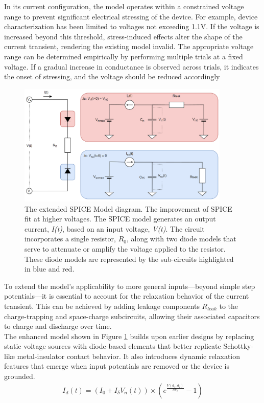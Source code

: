 \noindent In its current configuration, the model operates within a constrained voltage range to prevent significant electrical stressing of the device. For example, device characterization has been limited to voltages not exceeding 1.1V. If the voltage is increased beyond this threshold, stress-induced effects alter the shape of the current transient, rendering the existing model invalid. The appropriate voltage range can be determined empirically by performing multiple trials at a fixed voltage. If a gradual increase in conductance is observed across trials, it indicates the onset of stressing, and the voltage should be reduced accordingly \\

\begin{figure}[htbp!] 
    \centering    
    \includegraphics[width=0.9\textwidth]{Chapter5/Figs/h.png}
    \caption[The extended SPICE Model diagram.]{The extended SPICE Model diagram. The improvement of SPICE fit at higher voltages. The SPICE model generates an output current, \textit{I(t)}, based on an input voltage, \textit{V(t)}. The circuit incorporates a single resistor, $R_0$, along with two diode models that serve to attenuate or amplify the voltage applied to the resistor. These diode models are represented by the sub-circuits highlighted in blue and red.}
    \label{fig:5h}
\end{figure}

\noindent To extend the model’s applicability to more general inputs—beyond simple step potentials—it is essential to account for the relaxation behavior of the current transient. This can be achieved by adding leakage components $R_{leak}$ to the charge-trapping and space-charge subcircuits, allowing their associated capacitors to charge and discharge over time.\\

\noindent The enhanced model shown in Figure \ref{fig:5h} builds upon earlier designs by replacing static voltage sources with diode-based elements that better replicate Schottky-like metal-insulator contact behavior. It also introduces dynamic relaxation features that emerge when input potentials are removed or the device is grounded.
\begin{align}
I_d(t) = \left( I_0 + I_{\delta} V_n(t) \right)\times \left( e^{\frac{V(d_1,d_2)}{nV_t} }  - 1\right) \label{eq:5.8}
\end{align}


